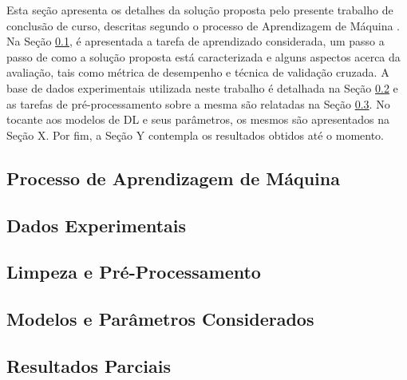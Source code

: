 Esta seção apresenta os detalhes da solução proposta pelo presente trabalho de conclusão de curso, descritas segundo o processo de Aprendizagem de Máquina \cite[vide Seção 1.5]{ref:marsland}. Na Seção  \ref{subsec:tarefa}, é apresentada a tarefa de aprendizado considerada, um passo a passo de como a solução proposta está caracterizada e alguns aspectos acerca da avaliação, tais como métrica de desempenho e técnica de validação cruzada. A base de dados experimentais utilizada neste trabalho é detalhada na Seção \ref{subsec:dados} e as tarefas de pré-processamento sobre a mesma são relatadas na Seção \ref{subsec:pre-process}. No tocante aos modelos de DL e seus parâmetros, os mesmos são apresentados na Seção X. Por fim, a Seção Y contempla os resultados obtidos até o momento.


\subsection{Processo de Aprendizagem de Máquina} \label{subsec:tarefa}


\subsection{Dados Experimentais} \label{subsec:dados}


\subsection{Limpeza e Pré-Processamento} \label{subsec:pre-process}


\subsection{Modelos e Parâmetros Considerados}

\subsection{Resultados Parciais} %

%
